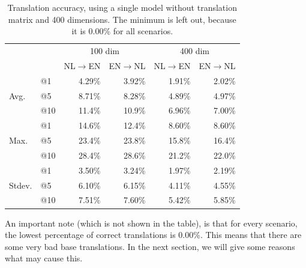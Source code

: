 \begin{table}[ht!]
  \centering
  \label{table:results_single_model_no_matrix}
  \begin{tabular}{ll|r|r|r|r|}
  \cline{3-6}                                       &     & \multicolumn{2}{|c|}{100 dim} & \multicolumn{2}{c|}{400 dim} \\ \cline{3-6} 
                                                    &     & NL$\to$EN   & EN$\to$NL       & NL$\to$EN   & EN$\to$NL      \\ \hline
    \multicolumn{1}{|l|}{\multirow{3}{*}{Avg.}}     & @1  & 4.29\%      & 3.92\%          & 1.91\%      & 2.02\%         \\ \cline{2-6} 
    \multicolumn{1}{|l|}{}                          & @5  & 8.71\%      & 8.28\%          & 4.89\%      & 4.97\%         \\ \cline{2-6} 
    \multicolumn{1}{|l|}{}                          & @10 & 11.4\%      & 10.9\%          & 6.96\%      & 7.00\%         \\ \hline 
    \multicolumn{1}{|l|}{\multirow{3}{*}{Max.}}     & @1  & 14.6\%      & 12.4\%          & 8.60\%      & 8.60\%         \\ \cline{2-6} 
    \multicolumn{1}{|l|}{}                          & @5  & 23.4\%      & 23.8\%          & 15.8\%      & 16.4\%         \\ \cline{2-6} 
    \multicolumn{1}{|l|}{}                          & @10 & 28.4\%      & 28.6\%          & 21.2\%      & 22.0\%         \\ \hline
    \multicolumn{1}{|l|}{\multirow{3}{*}{Stdev.}}   & @1  & 3.50\%      & 3.24\%          & 1.97\%      & 2.19\%         \\ \cline{2-6} 
    \multicolumn{1}{|l|}{}                          & @5  & 6.10\%      & 6.15\%          & 4.11\%      & 4.55\%         \\ \cline{2-6} 
    \multicolumn{1}{|l|}{}                          & @10 & 7.51\%      & 7.60\%          & 5.42\%      & 5.85\%         \\ \hline
  \end{tabular}
  \caption{Translation accuracy, using a single model without translation matrix and 400 dimensions. The minimum is left out, because it is 0.00\% for all scenarios.}
\end{table}

An important note (which is not shown in the table), is that for every scenario, the lowest percentage of correct translations is 0.00\%. This means that there are some very bad base translations. In the next section, we will give some reasons what may cause this.

